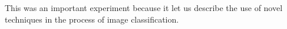 This was an important experiment because it let us describe the use of novel techniques in the process of image classification.